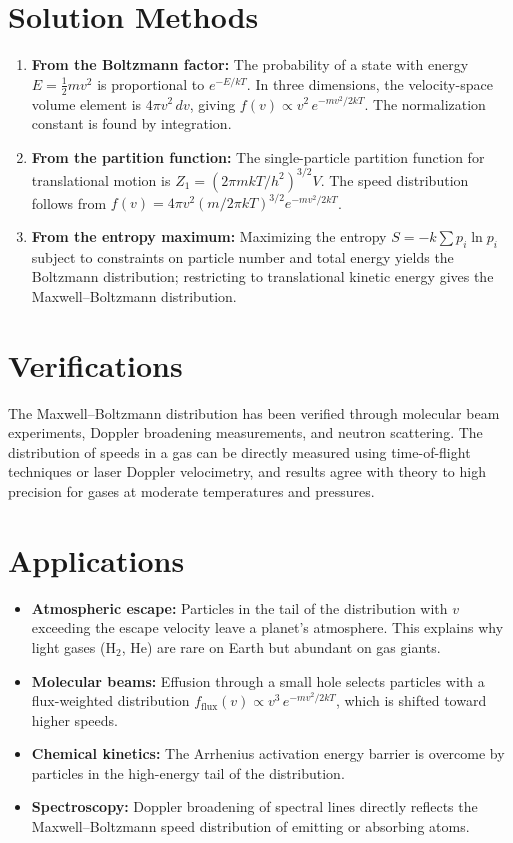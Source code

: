 \documentclass[11pt,openright]{book}
\begin{document}
\section*{Solution Methods}

\begin{enumerate}
  \item \textbf{From the Boltzmann factor:} The probability of a state with energy $E = \frac{1}{2}mv^{2}$ is proportional to $e^{-E/kT}$. In three dimensions, the velocity-space volume element is $4\pi v^{2}\,dv$, giving $f(v) \propto v^{2}\,e^{-mv^{2}/2kT}$. The normalization constant is found by integration.
  \item \textbf{From the partition function:} The single-particle partition function for translational motion is $Z_{1} = (2\pi mkT/h^{2})^{3/2}V$. The speed distribution follows from $f(v) = 4\pi v^{2}(m/2\pi kT)^{3/2}e^{-mv^{2}/2kT}$.
  \item \textbf{From the entropy maximum:} Maximizing the entropy $S = -k\sum p_{i}\ln p_{i}$ subject to constraints on particle number and total energy yields the Boltzmann distribution; restricting to translational kinetic energy gives the Maxwell--Boltzmann distribution.
\end{enumerate}
\section*{Verifications}

The Maxwell--Boltzmann distribution has been verified through molecular beam experiments, Doppler broadening measurements, and neutron scattering. The distribution of speeds in a gas can be directly measured using time-of-flight techniques or laser Doppler velocimetry, and results agree with theory to high precision for gases at moderate temperatures and pressures.
\section*{Applications}

\begin{itemize}
  \item \textbf{Atmospheric escape:} Particles in the tail of the distribution with $v$ exceeding the escape velocity leave a planet's atmosphere. This explains why light gases (H$_{2}$, He) are rare on Earth but abundant on gas giants.
  \item \textbf{Molecular beams:} Effusion through a small hole selects particles with a flux-weighted distribution $f_{\text{flux}}(v) \propto v^{3}\,e^{-mv^{2}/2kT}$, which is shifted toward higher speeds.
  \item \textbf{Chemical kinetics:} The Arrhenius activation energy barrier is overcome by particles in the high-energy tail of the distribution.
  \item \textbf{Spectroscopy:} Doppler broadening of spectral lines directly reflects the Maxwell--Boltzmann speed distribution of emitting or absorbing atoms.
\end{itemize}
\end{document}
